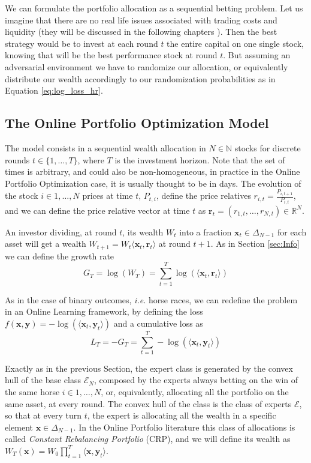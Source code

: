 We can formulate the portfolio allocation as a sequential betting problem. Let us imagine that there are no real life issues associated with trading costs and liquidity (they will be discussed in the following chapters ). Then the best strategy would be to invest at each round $t$ the entire capital on one single stock, knowing that will be the best performance stock at round $t$. But assuming an adversarial environment we have to randomize our allocation, or equivalently distribute our wealth accordingly to our randomization probabilities  as in Equation \eqref{eq:log_loss_hr}. 

\subsection{The Online Portfolio Optimization Model}

The model consists in a sequential wealth allocation in $N\in\mathbb N$ stocks for discrete rounds $t\in\{1,\ldots,T\}$, where $T$ is the investment horizon. Note that the set of times is arbitrary, and could also be non-homogeneous, in practice in the Online Portfolio Optimization case, it is usually thought to be in days. The evolution of the stock $i\in 1,\ldots,N$ prices at time $t$, $P_{t,i}$, define the price relatives $r_{i,t}=\frac{P_{i,t+1}}{P_{i,t}}$, and we can define the price relative vector at time $t$ as $\mathbf r_t=(r_{1,t},\ldots,r_{N,t})\in\mathbb R^N$. 

An investor dividing, at round $t$, its wealth $W_t$ into a fraction $\mathbf x_t\in\Delta_{N-1}$ for each asset will get a wealth $W_{t+1}=W_t\langle \mathbf x_t,\mathbf r_t\rangle$ at round $t+1$. As in Section \ref{sec:Info} we can define the growth rate 
$$G_T=\log(W_T)=\sum\limits_{t=1}^T\log(\langle\mathbf x_t, \mathbf r_t\rangle)$$

As in the case of binary outcomes, \emph{i.e.} horse races, we can redefine the problem in an Online Learning framework, by defining the loss $f(\mathbf x,\mathbf y)=-\log(\langle\mathbf x_t, \mathbf y_t\rangle)$ and a cumulative loss as 
$$L_T=-G_T=\sum\limits_{t=1}^T-\log(\langle\mathbf x_t,\mathbf y_t\rangle)$$

Exactly as in the previous Section, the expert class is generated by the convex hull of the base class $\mathcal E_N$, composed by the experts always betting on the win of the same horse $i\in1,\ldots,N$, or, equivalently, allocating all the portfolio on the same asset, at every round. The convex hull of the class is the class of experts $\mathcal E$, so that at every turn $t$, the expert is allocating all the wealth in a specific element $\mathbf x\in\Delta_{N-1}$. In the Online Portfolio literature this class of allocations is called \emph{Constant Rebalancing Portfolio} (CRP), and we will define its wealth as $W_T(\mathbf x)=W_0\prod\limits_{t=1}^T\langle\mathbf x,\mathbf y_t\rangle$. 

